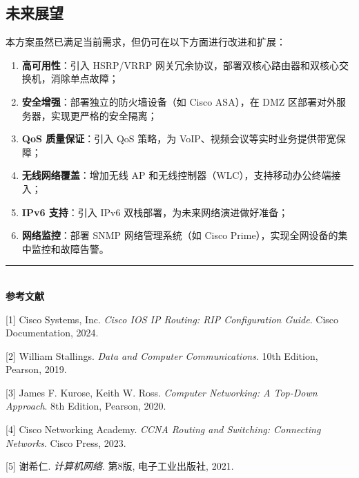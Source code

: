 \documentclass[12pt,a4paper]{ctexart}
\begin{document}
\subsection{未来展望}

本方案虽然已满足当前需求，但仍可在以下方面进行改进和扩展：

\begin{enumerate}[label=(\arabic*), leftmargin=2em]
    \item \textbf{高可用性}：引入 HSRP/VRRP 网关冗余协议，部署双核心路由器和双核心交换机，消除单点故障；
    \item \textbf{安全增强}：部署独立的防火墙设备（如 Cisco ASA），在 DMZ 区部署对外服务器，实现更严格的安全隔离；
    \item \textbf{QoS 质量保证}：引入 QoS 策略，为 VoIP、视频会议等实时业务提供带宽保障；
    \item \textbf{无线网络覆盖}：增加无线 AP 和无线控制器（WLC），支持移动办公终端接入；
    \item \textbf{IPv6 支持}：引入 IPv6 双栈部署，为未来网络演进做好准备；
    \item \textbf{网络监控}：部署 SNMP 网络管理系统（如 Cisco Prime），实现全网设备的集中监控和故障告警。
\end{enumerate}

\vspace{1cm}

\begin{flushright}
\begin{minipage}{6cm}
\centering
\rule{6cm}{0.4pt}\\[0.3cm]
\textbf{参考文献}

{[1]} Cisco Systems, Inc. \textit{Cisco IOS IP Routing: RIP Configuration Guide}. Cisco Documentation, 2024.

{[2]} William Stallings. \textit{Data and Computer Communications}. 10th Edition, Pearson, 2019.

{[3]} James F. Kurose, Keith W. Ross. \textit{Computer Networking: A Top-Down Approach}. 8th Edition, Pearson, 2020.

{[4]} Cisco Networking Academy. \textit{CCNA Routing and Switching: Connecting Networks}. Cisco Press, 2023.

{[5]} 谢希仁. \textit{计算机网络}. 第8版, 电子工业出版社, 2021.
\end{minipage}
\end{flushright}
\end{document}

